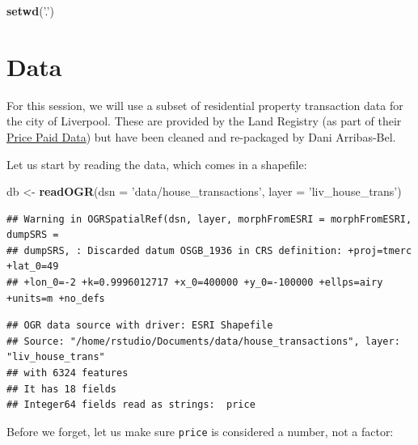 \documentclass[
]{book}
\newenvironment{Shaded}{\begin{snugshade}}{\end{snugshade}}
\newcommand{\DataTypeTok}[1]{\textcolor[rgb]{0.13,0.29,0.53}{#1}}
\newcommand{\KeywordTok}[1]{\textcolor[rgb]{0.13,0.29,0.53}{\textbf{#1}}}
\newcommand{\NormalTok}[1]{#1}
\newcommand{\OperatorTok}[1]{\textcolor[rgb]{0.81,0.36,0.00}{\textbf{#1}}}
\newcommand{\StringTok}[1]{\textcolor[rgb]{0.31,0.60,0.02}{#1}}
\begin{document}
\begin{Shaded}
\begin{Highlighting}[]
\KeywordTok{setwd}\NormalTok{(}\StringTok{'.'}\NormalTok{)}
\end{Highlighting}
\end{Shaded}

\hypertarget{data}{%
\section{Data}\label{data}}

For this session, we will use a subset of residential property transaction data for the city of Liverpool. These are provided by the Land Registry (as part of their \href{https://www.gov.uk/government/collections/price-paid-data}{Price Paid Data}) but have been cleaned and re-packaged by Dani Arribas-Bel.

Let us start by reading the data, which comes in a shapefile:

\begin{Shaded}
\begin{Highlighting}[]
\NormalTok{db <-}\StringTok{ }\KeywordTok{readOGR}\NormalTok{(}\DataTypeTok{dsn =} \StringTok{'data/house_transactions'}\NormalTok{, }\DataTypeTok{layer =} \StringTok{'liv_house_trans'}\NormalTok{)}
\end{Highlighting}
\end{Shaded}

\begin{verbatim}
## Warning in OGRSpatialRef(dsn, layer, morphFromESRI = morphFromESRI, dumpSRS =
## dumpSRS, : Discarded datum OSGB_1936 in CRS definition: +proj=tmerc +lat_0=49
## +lon_0=-2 +k=0.9996012717 +x_0=400000 +y_0=-100000 +ellps=airy +units=m +no_defs
\end{verbatim}

\begin{verbatim}
## OGR data source with driver: ESRI Shapefile 
## Source: "/home/rstudio/Documents/data/house_transactions", layer: "liv_house_trans"
## with 6324 features
## It has 18 fields
## Integer64 fields read as strings:  price
\end{verbatim}

Before we forget, let us make sure \texttt{price} is considered a number, not a factor:

\begin{Shaded}
\end{Shaded}
\end{document}
